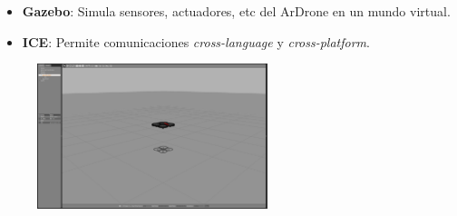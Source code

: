 \documentclass[notes,slidesec,a4]{seminar}
\begin{document}
\begin{hslide}
\begin{itemize}
\item \textbf{Gazebo}: Simula sensores, actuadores, etc del ArDrone en un mundo virtual.
\item \textbf{ICE}: Permite comunicaciones \textit{cross-language} y \textit{cross-platform}.
\end{itemize}

\begin{center}
\begin{figure}
\includegraphics[width=0.6\textwidth]{img/gazebo}
\end{figure}
\end{center}
\end{hslide}


\end{document}
